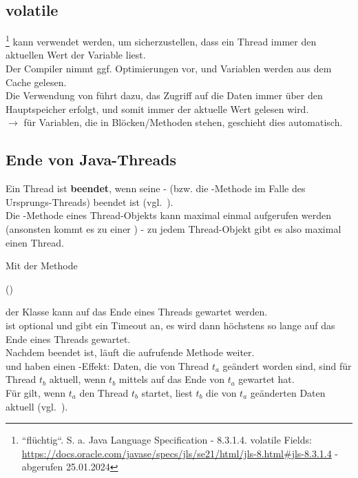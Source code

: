 \subsection*{volatile}
\footnote{``flüchtig``.
S. a. Java Language Specification - 8.3.1.4. volatile Fields: \url{https://docs.oracle.com/javase/specs/jls/se21/html/jls-8.html#jls-8.3.1.4} - abgerufen 25.01.2024
} kann verwendet werden, um sicherzustellen, dass ein Thread immer den aktuellen Wert der Variable liest.\\
Der Compiler nimmt ggf. Optimierungen vor, und Variablen werden aus dem Cache gelesen.\\
Die Verwendung von  führt dazu, das Zugriff auf die Daten immer über den Hauptspeicher erfolgt, und somit immer der aktuelle Wert gelesen wird.\\

$\rightarrow$ für Variablen, die in  Blöcken/Methoden stehen, geschieht dies automatisch.

\subsection{Ende von Java-Threads}\label{subsec:threadend}

Ein Thread ist \textbf{beendet}, wenn seine - (bzw. die -Methode im Falle des Ursprungs-Threads) beendet ist (vgl.~\cite[33]{Oec22}).\\

\noindent
Die -Methode eines Thread-Objekts kann maximal einmal aufgerufen werden (ansonsten kommt es zu einer ) - zu jedem Thread-Objekt gibt es also maximal einen Thread.

\noindent
Mit der Methode

\begin{center}
     ()
\end{center}

der Klasse  kann auf das Ende eines Threads gewartet werden.\\
 ist optional und gibt ein Timeout an, es wird dann höchstens so lange auf das Ende eines Threads gewartet.\\
Nachdem  beendet ist, läuft die aufrufende Methode weiter.\\

\noindent
{} und  haben einen -Effekt: Daten, die von Thread $t_a$ geändert worden sind, sind für Thread $t_b$ aktuell, wenn $t_b$ mittels  auf das Ende von $t_a$ gewartet hat.\\
Für  gilt, wenn $t_a$ den Thread $t_b$ startet, liest $t_b$ die von $t_a$ geänderten Daten aktuell (vgl.~\cite[37]{Oec22}).\\

